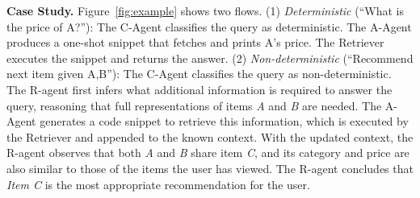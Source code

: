 

\textbf{Case Study.}
Figure~\ref{fig:example} shows two flows.
(1) \emph{Deterministic} (“What is the price of A?”): The C-Agent classifies the query as deterministic. The A-Agent produces a one-shot snippet that fetches and prints A’s price. The Retriever executes the snippet and returns the answer.
(2) \emph{Non-deterministic} (“Recommend next item given A,B”): The C-Agent classifies the query as non-deterministic. The R-agent first infers what additional information is required to answer the query, reasoning that full representations of items \textit{A} and \textit{B} are needed. The A-Agent generates a code snippet to retrieve this information, which is executed by the Retriever and appended to the known context. With the updated context, the R-agent observes that both \textit{A} and \textit{B} share item \textit{C}, and its category and price are also similar to those of the items the user has viewed. The R-agent concludes that \textit{Item C} is the most appropriate recommendation for the user.



